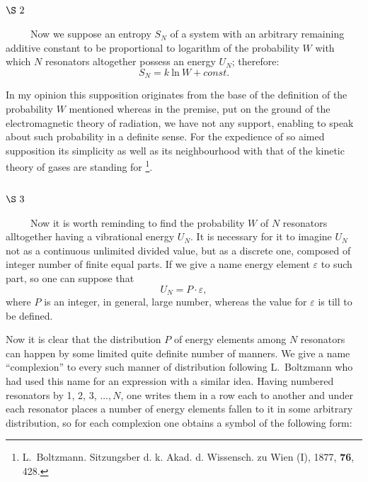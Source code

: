 \documentclass{article}
\begin{document}
\vspace{0.5cm}
\subsection*{
{\bf $\S~2$}}
\vspace{0.3cm}

~~~~~Now we suppose an entropy $S_N$ 
of a system with an arbitrary remaining additive constant 
to be proportional to logarithm of the probability $W$ 
with which $N$ resonators altogether possess an energy $U_N$; therefore:
\begin{equation}
S_N = k~\mbox{ln}~W + const.
\end{equation}

In my opinion this supposition originates from the base 
of the definition of the probability $W$ mentioned whereas in the premise, 
put on the ground of the electromagnetic theory of radiation, 
we have not any support, enabling to speak about such probability 
in a definite sense.
For the expedience of so aimed supposition its simplicity as well as 
its neighbourhood with that of the kinetic theory of gases are standing for
\footnote{L.~Boltzmann. Sitzungsber d. k. Akad. d. Wissensch. zu Wien (I), 
1877, {\bf 76}, 428.}.

\vspace{0.5cm}
\subsection*{
{\bf $\S~3$}}
\vspace{0.3cm}

~~~~~Now it is worth reminding to find the probability $W$ of $N$ resonators 
alltogether having a vibrational energy $U_N$. 
It is necessary for it to imagine $U_N$ not as a continuous 
unlimited divided value, but as a discrete one, 
composed of integer number of finite equal parts.
If we give a name energy element $\varepsilon$ to such part, 
so one can suppose that
\begin{equation}
U_N = P\cdot\varepsilon,
\end{equation}
where $P$ is an integer, in general, large number, whereas 
the value for $\varepsilon$ is till to be defined.

Now it is clear that the distribution $P$ of energy elements among $N$ 
resonators can happen by some limited quite definite number of manners.
We give a name ``complexion'' to every such manner of distribution 
following L.~Boltzmann who had used this name for an expression 
with a similar idea.
Having numbered resonators by 1, 2, 3, $\ldots, N$, 
one writes them in a row each to another and under each resonator places 
a number of energy elements fallen to it in some arbitrary distribution, 
so for each complexion one obtains a symbol of the following form:
\end{document}
